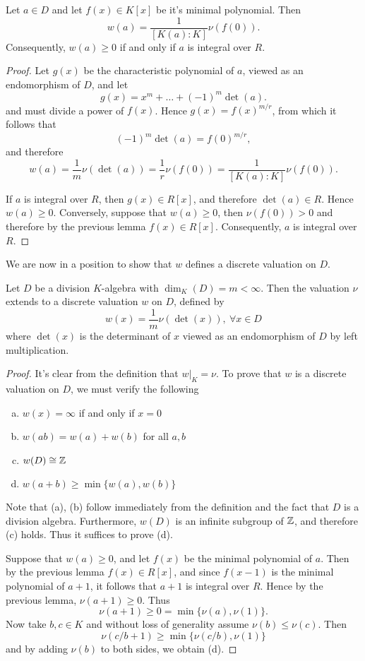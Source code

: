 \begin{lem}
Let $a\in D$ and let $f(x)\in K[x]$ be it's minimal polynomial.  Then
$$w(a) = \frac{1}{[K(a):K]} \nu(f(0)).$$
Consequently, $w(a)\geq 0$ if and only if $a$ is integral over $R$.
\end{lem}
\begin{proof}
Let $g(x)$ be the characteristic polynomial of $a$, viewed as an endomorphism of $D$, and let
$$g(x) = x^m + \dots + (-1)^m\det(a).$$
and must divide a power of $f(x)$.  Hence $g(x) = f(x)^{m/r}$, from which it follows that
$$(-1)^m\det(a) = f(0)^{m/r},$$
and therefore
$$w(a) = \frac{1}{m}\nu(\det(a)) = \frac{1}{r}\nu(f(0)) = \frac{1}{[K(a):K]}\nu(f(0)).$$

If $a$ is integral over $R$, then $g(x)\in R[x]$, and therefore $\det(a)\in R$.  Hence $w(a)\geq 0$.   Conversely, suppose that $w(a)\geq0$, then $\nu(f(0))>0$ and therefore by the previous lemma $f(x)\in R[x]$.  Consequently, $a$ is integral over $R$.
\end{proof}

We are now in a position to show that $w$ defines a discrete valuation on $D$.
\begin{thm}
Let $D$ be a division $K$-algebra with $\dim_K(D) = m<\infty$.  Then the valuation $\nu$ extends to a discrete valuation $w$ on $D$, defined by
$$w(x) = \frac{1}{m}\nu(\det(x)),\ \forall x\in D$$
where $\det(x)$ is the determinant of $x$ viewed as an endomorphism of $D$ by left multiplication.
\end{thm}
\begin{proof}
It's clear from the definition that $w|_K = \nu$.  To prove that $w$ is a discrete valuation on $D$, we must verify the following
\begin{enumerate}[(a)]
\item  $w(x) = \infty$ if and only if $x = 0$
\item  $w(ab) = w(a) + w(b)$ for all $a,b$
\item  $w(D)\cong \mathbb{Z}$
\item  $w(a+b)\geq \min\{w(a),w(b)\}$
\end{enumerate}
Note that (a), (b) follow immediately from the definition and the fact that $D$ is a division algebra.  Furthermore, $w(D)$ is an infinite subgroup of $\mathbb{Z}$, and therefore (c) holds.  Thus it suffices to prove (d).

Suppose that $w(a)\geq 0$, and let $f(x)$ be the minimal polynomial of $a$.  Then by the previous lemma $f(x)\in R[x]$, and since $f(x-1)$ is the minimal polynomial of $a+1$, it follows that $a+1$ is integral over $R$.  Hence by the previous lemma, $\nu(a +1)\geq 0$.  Thus
$$\nu(a+1) \geq 0 = \min\{\nu(a),\nu(1)\}.$$
Now take $b,c\in K$ and without loss of generality assume $\nu(b)\leq \nu(c)$.  Then
$$\nu(c/b + 1)\geq \min\{\nu(c/b),\nu(1)\}$$
and by adding $\nu(b)$ to both sides, we obtain (d).
\end{proof}

